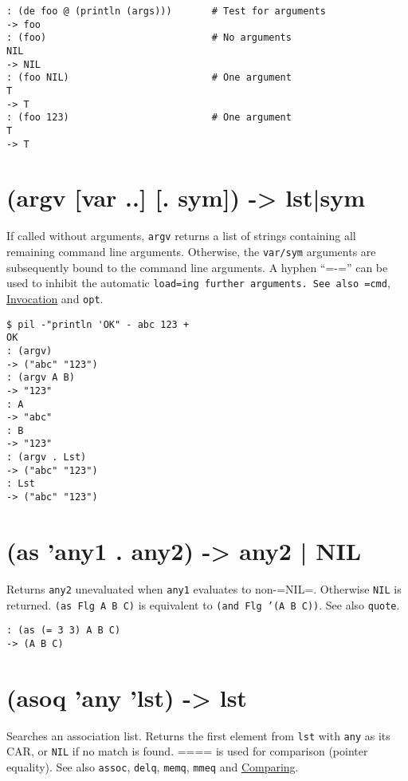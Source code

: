 \begin{verbatim}
: (de foo @ (println (args)))       # Test for arguments
-> foo
: (foo)                             # No arguments
NIL
-> NIL
: (foo NIL)                         # One argument
T
-> T
: (foo 123)                         # One argument
T
-> T
\end{verbatim}

 
\section{(argv [var ..] [. sym]) -> lst|sym}
\label{sec-8-1-1-24}


If called without arguments, \texttt{argv} returns a list of strings containing
all remaining command line arguments. Otherwise, the \texttt{var/sym} arguments
are subsequently bound to the command line arguments. A hyphen ``=-='' can
be used to inhibit the automatic \texttt{load=ing further arguments. See also =cmd}, \hyperref[ref.html-invoc]{Invocation} and \texttt{opt}.


\begin{verbatim}
$ pil -"println 'OK" - abc 123 +
OK
: (argv)
-> ("abc" "123")
: (argv A B)
-> "123"
: A
-> "abc"
: B
-> "123"
: (argv . Lst)
-> ("abc" "123")
: Lst
-> ("abc" "123")
\end{verbatim}

 
\section{(as 'any1 . any2) -> any2 | NIL}
\label{sec-8-1-1-25}


Returns \texttt{any2} unevaluated when \texttt{any1} evaluates to non-=NIL=. Otherwise
\texttt{NIL} is returned. \texttt{(as Flg A B C)} is equivalent to
\texttt{(and Flg '(A B C))}. See also \texttt{quote}.


\begin{verbatim}
: (as (= 3 3) A B C)
-> (A B C)
\end{verbatim}

 
\section{(asoq 'any 'lst) -> lst}
\label{sec-8-1-1-26}


Searches an association list. Returns the first element from \texttt{lst} with
\texttt{any} as its CAR, or \texttt{NIL} if no match is found. ==== is used for
comparison (pointer equality). See also \texttt{assoc}, \texttt{delq}, \texttt{memq}, \texttt{mmeq}
and \hyperref[ref.html-cmp]{Comparing}.


